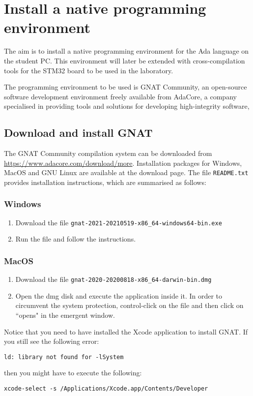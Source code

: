 
\chapter{Install a native programming environment}\label{ch:Assignment1}

The aim is to install a native programming environment for the Ada language on the student PC. This environment will later be extended with cross-compilation tools for the STM32 board to be used in the laboratory. 

The programming environment to be used is GNAT Community, an open-source software development environment freely available from AdaCore, a company specialised in providing tools and solutions for developing high-integrity software,
\section{Download and install GNAT}
The GNAT Community compilation system can be downloaded from \url{https://www.adacore.com/download/more}. Installation packages for Windows, MacOS and GNU Linux are available at the download page. The file {\tt README.txt} provides installation instructions, which are summarised as follows:
\subsection{Windows}
\begin{enumerate}
\item Download the file {\tt gnat-2021-20210519-x86\_64-windows64-bin.exe}
\item Run the file and follow the instructions.
\end{enumerate}
\subsection{MacOS}
\begin{enumerate}
\item Download the file {\tt gnat-2020-20200818-x86\_64-darwin-bin.dmg}
\item Open the dmg disk and execute the application inside it. In order to circumvent the system protection, control-click on the file and then click on ``opens" in the emergent window.
\end{enumerate}
Notice that you need to have installed the Xcode application to install GNAT. If you still see the following error:
\begin{verbatim}
ld: library not found for -lSystem
\end{verbatim}
then you might have to execute the following:
\begin{verbatim}
xcode-select -s /Applications/Xcode.app/Contents/Developer
\end{verbatim}

